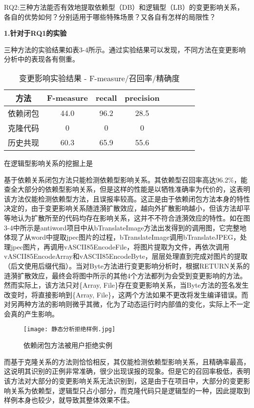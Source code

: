 RQ2:三种方法能否有效地提取依赖型（DB）和逻辑型（LB）的变更影响关系，各自的优势如何？分别适用于哪些特殊场景？又各自有怎样的局限性？

\textbf{1.针对于RQ1的实验}

三种方法的实验结果如表3-4所示。通过实验结果可以发现，不同方法在变更影响分析中的表现各有侧重。


\begin{table}[htbp]
    \caption{变更影响实验结果 - F-measure/召回率/精确度}
    \vspace{0.5em}\centering\wuhao
    \begin{tabular}{cccccccc}
    \toprule
    方法 & F-measure & recall & precision &  \\
    \midrule
    依赖闭包 & 44.0 & 96.2 & 28.5  \\
    克隆代码 & 0 & 0 &  0 &  \\
    历史共现 & 60.3 & 65.9 & 55.6  \\
    \bottomrule
    \end{tabular}
    \end{table}




在逻辑型影响关系的挖掘上是

基于依赖关系闭包方法只能检测依赖型影响关系。其依赖型召回率高达96.2\%，能查全大部分的依赖型影响关系，但是这样的性能是以牺牲准确率为代价的，这表明该方法仅能检测依赖型方法，且误报率较高。这正是由于依赖闭包方法本身的特性决定的，由于变更影响关系随涟漪扩散效应，越向外扩散影响越小，但该方法却平等地认为扩散所至的代码均存在影响关系，这并不不符合涟漪效应的特性。如在图3-4中所示是antiword项目中从bTranslateImage方法出发得到的调用图，它完整地体现了从word中提取jpec图片的过程，bTranslateImage调用bTranslateJPEG，处理jpec图片，再调用vASCII85EncodeFile，将图片提取为文件，再依次调用vASCII85EncodeArray和vASCII85EncodeByte，层层处理直到完成对图片的提取（后文使用后缀代指）。当对Byte方法进行变更影响分析时，根据RETURN关系的涟漪扩散效应，最终会将图中所示的其他4个方法都列为会受到变更影响的方法。然而实际上，该方法只对\{Array, File\}存在变更影响关系，当Byte方法的签名发生改变时，将直接影响到\{Array, File\}，这两个方法如果不更改将发生编译错误。而对另两种方法的影响则微乎其微，化为了动态运行时内部值的变化，实际上不一定会真的产生影响。

\begin{figure}[h]
\centering
\texttt{[image: 静态分析拒绝样例.jpg]}
\caption{依赖闭包方法被用户拒绝实例}
\end{figure}

而基于克隆关系的方法则恰恰相反，其仅能检测依赖型影响关系，且精确率最高，这说明其识别的正例非常准确，很少出现误报的现象。但是它的召回率极低，表明该方法对大部分的变更影响关系无法识别到，这是由于在项目中，大部分的变更影响关系为依赖型，逻辑型只占小部分，而克隆代码只是逻辑型的一种，因此提取到样例本身也较少，就导致其整体效果不佳。


